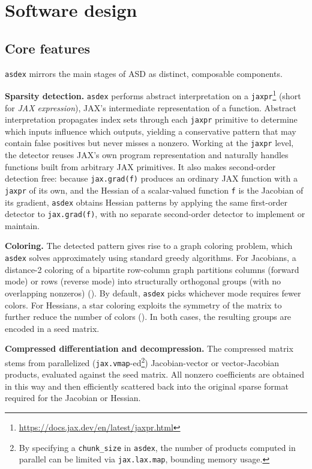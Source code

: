 \documentclass[
]{article}
\begin{document}
\section{Software design}\label{software-design}

\subsection{Core features}\label{core-features}

\texttt{asdex} mirrors the main stages of ASD as distinct, composable
components.

\textbf{Sparsity detection.} \texttt{asdex} performs abstract
interpretation on a \texttt{jaxpr}\footnote{\url{https://docs.jax.dev/en/latest/jaxpr.html}}
(short for \emph{JAX expression}), JAX's intermediate representation of
a function. Abstract interpretation propagates index sets through each
\texttt{jaxpr} primitive to determine which inputs influence which
outputs, yielding a conservative pattern that may contain false
positives but never misses a nonzero. Working at the \texttt{jaxpr}
level, the detector reuses JAX's own program representation and
naturally handles functions built from arbitrary JAX primitives. It also
makes second-order detection free: because \texttt{jax.grad(f)} produces
an ordinary JAX function with a \texttt{jaxpr} of its own, and the
Hessian of a scalar-valued function \texttt{f} is the Jacobian of its
gradient, \texttt{asdex} obtains Hessian patterns by applying the same
first-order detector to \texttt{jax.grad(f)}, with no separate
second-order detector to implement or maintain.

\textbf{Coloring.} The detected pattern gives rise to a graph coloring
problem, which \texttt{asdex} solves approximately using standard greedy
algorithms. For Jacobians, a distance-2 coloring of a bipartite
row-column graph partitions columns (forward mode) or rows (reverse
mode) into structurally orthogonal groups (with no overlapping nonzeros)
(). By
default, \texttt{asdex} picks whichever mode requires fewer colors. For
Hessians, a star coloring exploits the symmetry of the matrix to further
reduce the number of colors
().
In both cases, the resulting groups are encoded in a seed matrix.

\textbf{Compressed differentiation and decompression.} The compressed
matrix stems from parallelized (\texttt{jax.vmap}-ed\footnote{By
  specifying a \texttt{chunk\_size} in \texttt{asdex}, the number of
  products computed in parallel can be limited via \texttt{jax.lax.map},
  bounding memory usage.}) Jacobian-vector or vector-Jacobian products,
evaluated against the seed matrix. All nonzero coefficients are obtained
in this way and then efficiently scattered back into the original sparse
format required for the Jacobian or Hessian.
\end{document}
